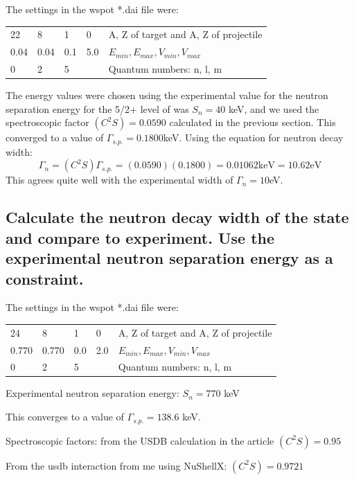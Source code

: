 \documentclass[12pt]{article}
\begin{document}
The settings in the wspot *.dai file were: 
\begin{center}
 \begin{tabular}{l l l l l}
 22 & 8 & 1 & 0 & A, Z of target and A, Z of projectile\\
 0.04 & 0.04 & 0.1 & 5.0& $E_{min}, E_{max}, V_{min}, V_{max}$  \\
 0 & 2 & 5 & & Quantum numbers: n, l, m \\
 \end{tabular}
\end{center}
The energy values were chosen using the experimental value for the neutron separation energy for the 5/2+ level of  was $S_n=40$ keV, and we used the spectroscopic factor $(C^2S)=0.0590$ calculated in the previous section. This converged to a value of $\Gamma_{s.p.}=0.1800$keV. Using the equation for neutron decay width: 
\begin{equation}
\Gamma_n=(C^2S)\Gamma_{s.p.}=(0.0590)(0.1800)=0.01062 \text{keV}=10.62 \text{eV}
\end{equation}
This agrees quite well with the experimental width of $\Gamma_n=10$eV. 

	\subsection{Calculate the neutron decay width of the   state and compare to experiment. Use the experimental neutron separation energy as a constraint.}

The settings in the wspot *.dai file were: 
\begin{center}
 \begin{tabular}{l l l l l}
 24 & 8 & 1 & 0 & A, Z of target and A, Z of projectile\\
 0.770 & 0.770 & 0.0 & 2.0& $E_{min}, E_{max}, V_{min}, V_{max}$  \\
 0 & 2 & 5 & & Quantum numbers: n, l, m \\
 \end{tabular}
\end{center}

Experimental neutron separation energy: $S_n=770$ keV

This converges to a value of $\Gamma_{s.p.}=138.6$ keV. 

Spectroscopic factors: from the USDB calculation in the article $(C^2S)=0.95$

\qquad From the usdb interaction from me using NuShellX: $(C^2S)=0.9721$
\end{document}
